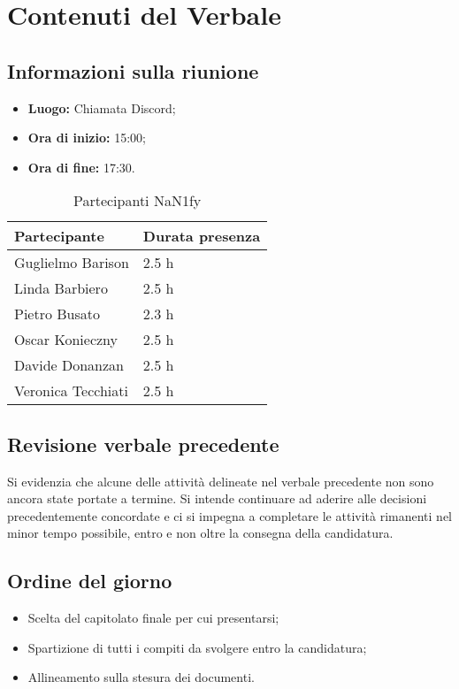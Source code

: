 \section{Contenuti del Verbale}
\subsection{Informazioni sulla riunione}
\begin{itemize}
	\setlength\itemsep{0em}
	\item\textbf{Luogo:} Chiamata Discord;
	\item\textbf{Ora di inizio:} 15:00;
	\item\textbf{Ora di fine:}  17:30.
\end{itemize}
\begin{table}[ht!]
	\begin{minipage}[t]{0.5\linewidth}
		\centering
		\begin{tabular}{p{3cm} p{3cm}}
			\toprule
			\textbf{Partecipante} & \textbf{Durata presenza} \\
			\midrule
			Guglielmo Barison & 2.5 h \\
			Linda Barbiero &  2.5 h \\
			Pietro Busato & 2.3 h \\
			Oscar Konieczny & 2.5 h \\
			Davide Donanzan & 2.5 h \\
			Veronica Tecchiati & 2.5 h \\
			\bottomrule
		\end{tabular}
		\caption{Partecipanti NaN1fy}
		\label{table:Partecipanti NaN1fy}
	\end{minipage}
\end{table}
\subsection{Revisione verbale precedente}
Si evidenzia che alcune delle attività delineate nel verbale precedente non sono ancora state portate a termine.
Si intende continuare ad aderire alle decisioni precedentemente concordate e ci si impegna a completare le attività rimanenti nel minor tempo possibile, entro e non oltre la consegna della candidatura.
\subsection{Ordine del giorno}
\begin{itemize}
	\setlength\itemsep{0em}
	\item Scelta del capitolato finale per cui presentarsi;
	\item Spartizione di tutti i compiti da svolgere entro la candidatura;
	\item Allineamento sulla stesura dei documenti.
\end{itemize}

